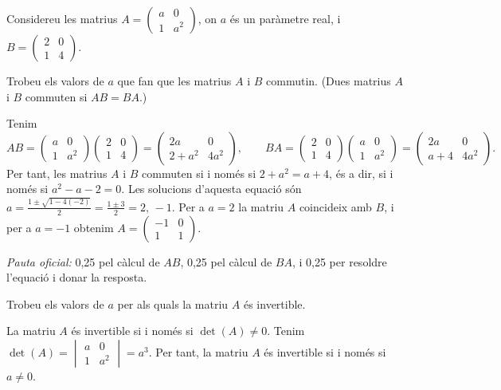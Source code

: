 Considereu les matrius $A=\begin{pmatrix}a&0\\1&a^2\end{pmatrix}$, on $a$ és un paràmetre real, i
$B=\begin{pmatrix}2&0\\1&4\end{pmatrix}$.

\begin{apartats}

Trobeu els valors de $a$ que fan que les matrius $A$ i $B$ commutin. (Dues matrius $A$ i $B$ commuten si
$AB=BA$.)

\begin{solucio}
Tenim
\[
AB=\begin{pmatrix}a&0\\1&a^2\end{pmatrix}\begin{pmatrix}2&0\\1&4\end{pmatrix}=\begin{pmatrix}2a&0\\2+a^2&4a^2\end{pmatrix},
\qquad
BA=\begin{pmatrix}2&0\\1&4\end{pmatrix}\begin{pmatrix}a&0\\1&a^2\end{pmatrix}=\begin{pmatrix}2a&0\\a+4&4a^2\end{pmatrix}.
\]
Per tant, les matrius $A$ i $B$ commuten si i només si $2+a^2=a+4$, és a dir, si i només si $a^2-a-2=0$. Les
solucions d'aquesta equació són $a=\frac{1\pm\sqrt{1-4(-2)}}{2}=\frac{1\pm3}{2}=2,\,-1$. Per a $a=2$ la matriu $A$
coincideix amb $B$, i per a $a=-1$ obtenim $A=\begin{pmatrix}-1&0\\1&1\end{pmatrix}$.

\textit{Pauta oficial:} 0,25 pel càlcul de $AB$, 0,25 pel càlcul de $BA$, i 0,25 per resoldre l'equació i
donar la resposta.
\end{solucio}

Trobeu els valors de $a$ per als quals la matriu $A$ és invertible.

\begin{solucio}
La matriu $A$ és invertible si i només si $\det(A)\neq0$. Tenim
$\det(A)=\begin{vmatrix}a&0\\1&a^2\end{vmatrix}=a^3$. Per tant, la matriu $A$ és invertible si i només si $a\neq0$.


\end{solucio}
\end{apartats}
